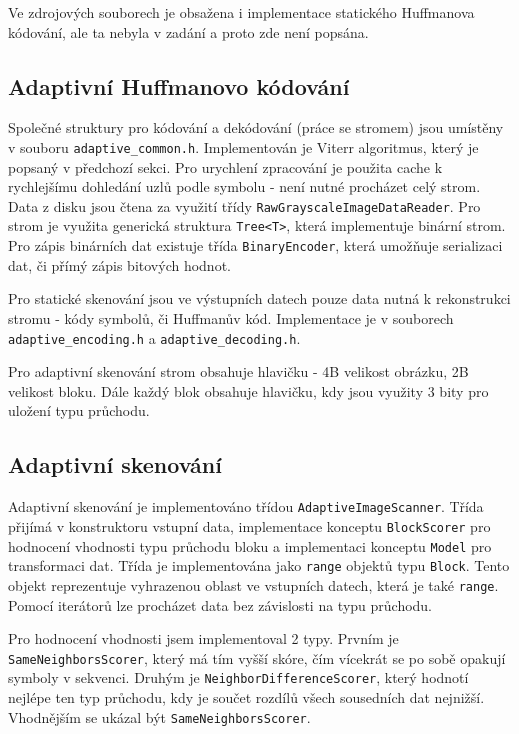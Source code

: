 \documentclass[12pt,a4paper,titlepage,final]{report}
\begin{document}
Ve zdrojových souborech je obsažena i implementace statického Huffmanova kódování, ale ta nebyla v zadání a proto zde není popsána.

\subsection{Adaptivní Huffmanovo kódování}
Společné struktury pro kódování a dekódování (práce se stromem) jsou umístěny v souboru \texttt{adaptive\_common.h}. Implementován je Viterr algoritmus, který je popsaný v předchozí sekci. Pro urychlení zpracování je použita cache k rychlejšímu dohledání uzlů podle symbolu - není nutné procházet celý strom. Data z disku jsou čtena za využití třídy \texttt{RawGrayscaleImageDataReader}. Pro strom je využita generická struktura \texttt{Tree<T>}, která implementuje binární strom. Pro zápis binárních dat existuje třída \texttt{BinaryEncoder}, která umožňuje serializaci dat, či přímý zápis bitových hodnot. 

Pro statické skenování jsou ve výstupních datech pouze data nutná k rekonstrukci stromu - kódy symbolů, či Huffmanův kód. Implementace je v souborech \texttt{adaptive\_encoding.h} a \texttt{adaptive\_decoding.h}.

Pro adaptivní skenování strom obsahuje hlavičku - 4B velikost obrázku, 2B velikost bloku. Dále každý blok obsahuje hlavičku, kdy jsou využity 3 bity pro uložení typu průchodu. 

\subsection{Adaptivní skenování}
Adaptivní skenování je implementováno třídou \texttt{AdaptiveImageScanner}. Třída přijímá v konstruktoru vstupní data, implementace konceptu \texttt{BlockScorer} pro hodnocení vhodnosti typu průchodu bloku a implementaci konceptu \texttt{Model} pro transformaci dat. Třída je implementována jako \texttt{range} objektů typu \texttt{Block}. Tento objekt reprezentuje vyhrazenou oblast ve vstupních datech, která je také \texttt{range}. Pomocí iterátorů lze procházet data bez závislosti na typu průchodu.

Pro hodnocení vhodnosti jsem implementoval 2 typy. Prvním je \texttt{SameNeighborsScorer}, který má tím vyšší skóre, čím vícekrát se po sobě opakují symboly v sekvenci. Druhým je \texttt{NeighborDifferenceScorer}, který hodnotí nejlépe ten typ průchodu, kdy je součet rozdílů všech sousedních dat nejnižší. Vhodnějším se ukázal být \texttt{SameNeighborsScorer}.
\end{document}
